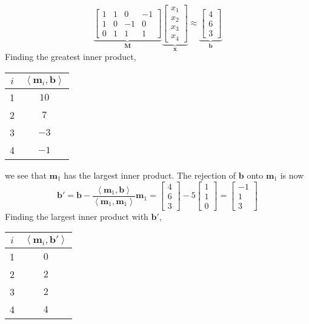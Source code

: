 \documentclass[]{article}
\newcommand{\iprod}[2]{\left\langle #1, #2 \right\rangle}
\begin{document}
\begin{equation}
	\underbrace{\begin{bmatrix}
		1 & 1 & 0 & -1 \\
		1 & 0 & -1 & 0 \\
		0 & 1 & 1 & 1
		\end{bmatrix}}_{\bm{M}}
	\underbrace{\begin{bmatrix}
		x_1 \\
		x_2 \\
		x_3 \\
		x_4
		\end{bmatrix}}_{\bm{x}} \approx 
	\underbrace{\begin{bmatrix}
		4 \\
		6 \\
		3
		\end{bmatrix}}_{\bm{b}}
\end{equation}
Finding the greatest inner product, 
\begin{center}
\begin{tabular}{c|c}
	\(i\) & \(\iprod{\bm{m}_i}{\bm{b}}\) \\
	\hline
	1 & \(10\) \\
	2 & \(7\) \\
	3 & \(-3\) \\
	4 & \(-1\)
\end{tabular}
\end{center}
we see that \(\bm{m}_1\) has the largest inner product. 
The rejection of \(\bm{b}\) onto \(\bm{m}_1\) is now
\begin{equation}
	\bm{b}' = \bm{b} - \frac{\iprod{\bm{m}_1}{\bm{b}}}{\iprod{\bm{m}_1}{\bm{m}_1}} \bm{m}_1 = \begin{bmatrix}
	4 \\
	6 \\
	3
	\end{bmatrix} - 5 \begin{bmatrix}
	1 \\
	1 \\
	0
	\end{bmatrix} = \begin{bmatrix}
	-1 \\
	1 \\
	3
	\end{bmatrix}
\end{equation}
Finding the largest inner product with \(\bm{b}'\), 
\begin{center}
\begin{tabular}{c|c}
	\(i\) & \(\iprod{\bm{m}_i}{\bm{b}'}\) \\
	\hline
	1 & \(0\) \\
	2 & \(2\) \\
	3 & \(2\) \\
	4 & \(4\)
\end{tabular}
\end{center}
\end{document}
